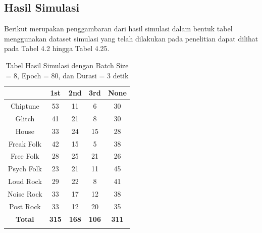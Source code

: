 \subsection{Hasil Simulasi}
\label{subsec:hasilsimulasi}

Berikut merupakan penggambaran dari hasil simulasi dalam bentuk tabel menggunakan dataset simulasi yang telah dilakukan pada penelitian dapat dilihat pada Tabel 4.2 hingga Tabel 4.25.

\begin{longtable}[c]{|c|c|c|c|c|}
	\hline
	\textbf{}      & \textbf{1st} & \textbf{2nd} & \textbf{3rd} & \textbf{None} \\ \hline
	\endfirsthead
	\endhead
	Chiptune       & 53           & 11           & 6            & 30            \\ \hline
	Glitch         & 41           & 21           & 8            & 30            \\ \hline
	House          & 33           & 24           & 15           & 28            \\ \hline
	Freak Folk     & 42           & 15           & 5            & 38            \\ \hline
	Free Folk      & 28           & 25           & 21           & 26            \\ \hline
	Psych Folk     & 23           & 21           & 11           & 45            \\ \hline
	Loud Rock      & 29           & 22           & 8            & 41            \\ \hline
	Noise Rock     & 33           & 17           & 12           & 38            \\ \hline
	Post Rock      & 33           & 12           & 20           & 35            \\ \hline
	\textbf{Total} & \textbf{315} & \textbf{168} & \textbf{106} & \textbf{311}  \\ \hline
	\caption{Tabel Hasil Simulasi dengan Batch Size = 8, Epoch = 80, dan Durasi = 3 detik}
	\label{tab:my-table}\\
\end{longtable}

